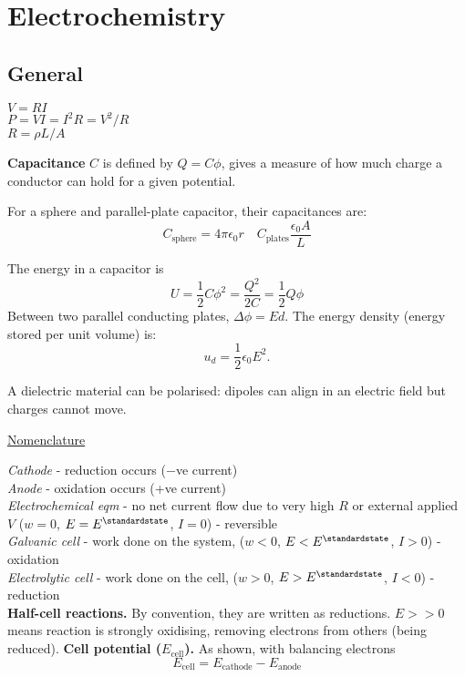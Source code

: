 \pagebreak

\section{Electrochemistry}

\subsection*{General}
$V = RI$ \\
$P = VI = I^2R = V^2/R$ \\
$R = \rho L / A$

\textbf{Capacitance} $C$ is defined by $Q=C\phi$, gives a measure of how much charge a conductor can hold
for a given potential.

For a sphere and parallel-plate capacitor, their capacitances are:
\begin{equation*}
    C_{\textrm{sphere}} = 4 \pi \epsilon_0 r \quad C_{\textrm{plates}} \frac{\epsilon_0 A}{L}
\end{equation*}

The energy in a capacitor is
\begin{equation*}
    U = \frac{1}{2}C\phi^2 = \frac{Q^2}{2C} = \frac{1}{2}Q\phi
\end{equation*}
Between two parallel conducting plates, $\Delta \phi = Ed$. The energy density (energy stored per unit volume) is:
\begin{equation*}
    u_d = \frac{1}{2}\epsilon_0 E^2.
\end{equation*}

A dielectric material can be polarised: dipoles can align in an electric field
but charges cannot move.

\underline{Nomenclature}

\textit{Cathode} - reduction occurs ($-$ve current)\\
\textit{Anode} - oxidation occurs  (+ve current)\\
\textit{Electrochemical eqm} - no net current flow due to very high $R$ or external applied $V$ ($w = 0$, $E = E^\standardstate$, $I = 0$) - reversible\\
\textit{Galvanic cell} - work done on the system, ($w < 0$, $E < E^\standardstate$, $I > 0$) - oxidation\\
\textit{Electrolytic cell} - work done on the cell, ($w > 0$, $E > E^\standardstate$, $I < 0$) - reduction\\
\textbf{Half-cell reactions.} By convention, they are written as reductions. $ E >> 0$
means reaction is strongly oxidising, removing electrons from others (being reduced).
\textbf{Cell potential ($E_{\mathrm{cell}}$).} As shown, with balancing electrons
\begin{equation*}
    E_{\mathrm{cell}} = E_{\mathrm{cathode}} - E_{\mathrm{anode}}
\end{equation*}
